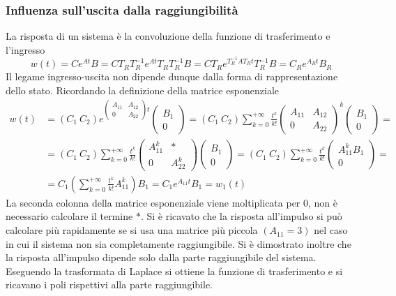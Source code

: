 \subsubsection{Influenza sull'uscita dalla raggiungibilità}
La risposta di un sistema è la convoluzione della funzione di trasferimento e
l'ingresso
$$
w(t) = Ce^{At}B = CT_RT_R^{-1}e^{At}T_RT_R^{-1}B
= CT_Re^{T_R^{-1}AT_Rt}T_R^{-1}B = C_Re^{A_Rt}B_R
$$
Il legame ingresso-uscita non dipende dunque dalla forma di rappresentazione
dello stato. Ricordando la definizione della matrice esponenziale
$$\begin{aligned}
w(t) &= (C_1\ C_2) e^{\begin{pmatrix}
A_{11} & A_{12} \\
0 & A_{22}
\end{pmatrix}t}\begin{pmatrix}
B_1 \\ 0
\end{pmatrix} =
(C_1 \ C_2) \sum_{k=0}^{+\infty} \frac{t^k}{k!}\begin{pmatrix}
A_{11} & A_{12} \\
0 & A_{22}
\end{pmatrix}^k
\begin{pmatrix}
B_1 \\ 0
\end{pmatrix} = \\
&= (C_1 \ C_2) \sum_{k=0}^{+\infty} \frac{t^k}{k!}
\begin{pmatrix}
A_{11}^k & * \\
0 & A_{22}^k
\end{pmatrix}
\begin{pmatrix}
B_1 \\ 0
\end{pmatrix} =
(C_1 \ C_2) \sum_{k=0}^{+\infty} \frac{t^k}{k!}
\begin{pmatrix}
A_{11}^k B_1 \\ 0
\end{pmatrix} = \\
&= C_1\left(\sum_{k=0}^{+\infty} \frac{t^k}{k!}
A_{11}^k\right)B_1 = C_1 e^{A_{11}t}B_1 = w_1(t)
\end{aligned}
$$
La seconda colonna della matrice esponenziale viene moltiplicata per 0, non è
necessario calcolare il termine $*$.
Si è ricavato che la risposta all'impulso si può calcolare più rapidamente se
si usa una matrice più piccola $(A_{11}=3)$ nel caso in cui il sistema non sia
completamente raggiungibile. Si è dimostrato inoltre che la risposta
all'impulso dipende solo dalla parte raggiungibile del sistema.
Eseguendo la trasformata di Laplace si ottiene la funzione di trasferimento e
si ricavano i poli rispettivi alla parte raggiungibile.

